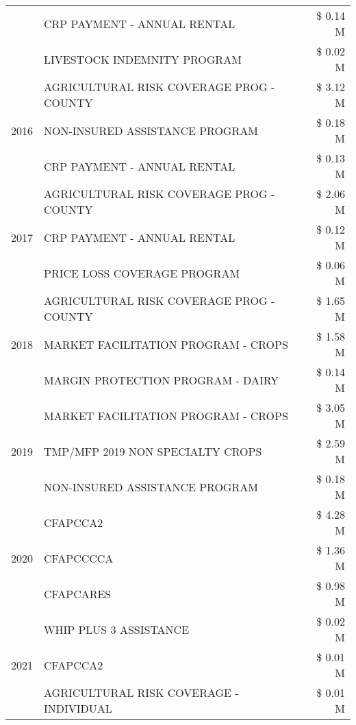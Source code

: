\begin{tabular}{llr}
 & CRP PAYMENT - ANNUAL RENTAL & \$ 0.14 M \\
 & LIVESTOCK INDEMNITY PROGRAM & \$ 0.02 M \\
\cline{1-3}
\multirow[t]{3}{*}{2016} & AGRICULTURAL RISK COVERAGE PROG - COUNTY & \$ 3.12 M \\
 & NON-INSURED ASSISTANCE PROGRAM & \$ 0.18 M \\
 & CRP PAYMENT - ANNUAL RENTAL & \$ 0.13 M \\
\cline{1-3}
\multirow[t]{3}{*}{2017} & AGRICULTURAL RISK COVERAGE PROG - COUNTY & \$ 2.06 M \\
 & CRP PAYMENT - ANNUAL RENTAL & \$ 0.12 M \\
 & PRICE LOSS COVERAGE PROGRAM & \$ 0.06 M \\
\cline{1-3}
\multirow[t]{3}{*}{2018} & AGRICULTURAL RISK COVERAGE PROG - COUNTY & \$ 1.65 M \\
 & MARKET FACILITATION PROGRAM - CROPS & \$ 1.58 M \\
 & MARGIN PROTECTION PROGRAM - DAIRY & \$ 0.14 M \\
\cline{1-3}
\multirow[t]{3}{*}{2019} & MARKET FACILITATION PROGRAM - CROPS & \$ 3.05 M \\
 & TMP/MFP 2019 NON SPECIALTY CROPS & \$ 2.59 M \\
 & NON-INSURED ASSISTANCE PROGRAM & \$ 0.18 M \\
\cline{1-3}
\multirow[t]{3}{*}{2020} & CFAPCCA2 & \$ 4.28 M \\
 & CFAPCCCCA & \$ 1.36 M \\
 & CFAPCARES & \$ 0.98 M \\
\cline{1-3}
\multirow[t]{3}{*}{2021} & WHIP PLUS 3 ASSISTANCE & \$ 0.02 M \\
 & CFAPCCA2 & \$ 0.01 M \\
 & AGRICULTURAL RISK COVERAGE - INDIVIDUAL & \$ 0.01 M \\
\cline{1-3}
\bottomrule
\end{tabular}
